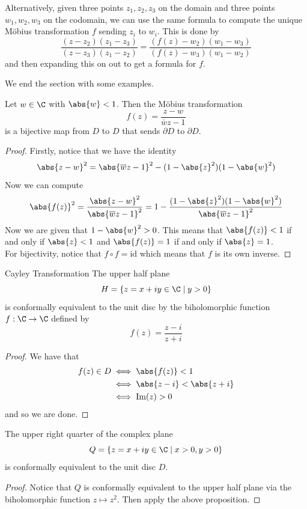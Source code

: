 \documentclass[a4paper]{article}
\begin{document}
Alternatively, given three points $z_1,z_2,z_3$ on the domain and three points $w_1,w_2,w_3$ on the codomain, we can use the same formula to compute the unique Möbius transformation $f$ sending $z_i$ to $w_i$. This is done by $$\frac{(z-z_2)(z_1-z_3)}{(z-z_3)(z_1-z_2)}=\frac{(f(z)-w_2)(w_1-w_3)}{(f(z)-w_3)(w_1-w_2)}$$ and then expanding this on out to get a formula for $f$. 

We end the section with some examples. 

\begin{thm}{}{} Let $w\in\C$ with $\abs{w}<1$. Then the Möbius transformation $$f(z)=\frac{z-w}{\overline{w}z-1}$$ is a bijective map from $D$ to $D$ that sends $\partial D$ to $\partial D$. 
\begin{proof}
Firstly, notice that we have the identity $$\abs{z-w}^2=\abs{\overline{w}z-1}^2-(1-\abs{z}^2)(1-\abs{w}^2)$$ Now we can compute $$\abs{f(z)}^2=\frac{\abs{z-w}^2}{\abs{\overline{w}z-1}^2}=1-\frac{(1-\abs{z}^2)(1-\abs{w}^2)}{\abs{\overline{w}z-1}^2}$$ Now we are given that $1-\abs{w}^2>0$. This means that $\abs{f(z)}<1$ if and only if $\abs{z}<1$ and $\abs{f(z)}=1$ if and only if $\abs{z}=1$. \\

For bijectivity, notice that $f\circ f=\text{id}$ which means that $f$ is its own inverse. 
\end{proof}
\end{thm}

\begin{prp}{Cayley Transformation}{} The upper half plane $$H=\{z=x+iy\in\C\;|\;y>0\}$$ is conformally equivalent to the unit disc by the biholomorphic function $f:\C\to\C$ defined by $$f(z)=\frac{z-i}{z+i}$$ 
\begin{proof}
We have that 
\begin{align*}
f(z)\in D&\iff \abs{f(z)}<1\\
&\iff \abs{z-i}<\abs{z+i}\\
&\iff\text{Im}(z)>0
\end{align*}
and so we are done. 
\end{proof}
\end{prp}

\begin{prp}{}{} The upper right quarter of the complex plane $$Q=\{z=x+iy\in\C\;|\;x>0,y>0\}$$ is conformally equivalent to the unit disc $D$. 
\begin{proof}
Notice that $Q$ is conformally equivalent to the upper half plane via the biholomorphic function $z\mapsto z^2$. Then apply the above proposition. 
\end{proof}
\end{prp}
\end{document}
